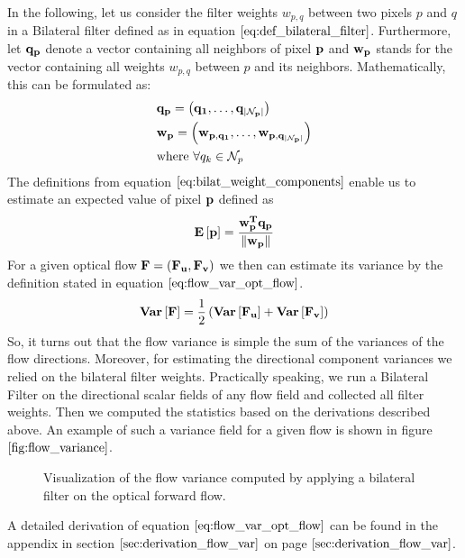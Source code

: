 In the following, let us consider the filter weights $w_{p,q}$ between two pixels $p$ and $q$ in a Bilateral filter defined as in equation $\ref{eq:def_bilateral_filter}$. Furthermore, let $\bf{q}_p$ denote a vector containing all neighbors of pixel $\bf{p}$ and $\bf{w}_p$ stands for the vector containing all weights $w_{p,q}$ between $p$ and its neighbors. Mathematically, this can be formulated as:
\begin{equation}
\begin{aligned}
& \bf{q_p} = \left( q_1, \dots, q_{|\mathcal{N}_p|} \right) \\
& \bf{w_p} = \left( w_{p, q_1}, \dots, w_{p, q_{|\mathcal{N}_p|}} \right) \\
& \text{where } \forall q_k \in \mathcal{N}_p
\end{aligned}
\label{eq:bilat_weight_components}
\end{equation}
The definitions from equation $\ref{eq:bilat_weight_components}$ enable us to estimate an expected value of pixel $\bf{p}$ defined as
\begin{equation}
	\mathbf{E} \left[ \bf{p} \right] = \frac{\bf{w}_{p}^{T} \bf{q}_p}{\left\lVert\bf{w}_{p}\right\rVert}
\end{equation}
For a given optical flow $\bf{F} = (\bf{F_u}, \bf{F_v})$ we then can estimate its variance by the definition stated in equation $\ref{eq:flow_var_opt_flow}$.
\begin{equation}
	\mathbf{Var} \left[ \bf{F} \right] = \frac{1}{2} \left( \mathbf{Var} \left[ \bf{F_u} \right] + \mathbf{Var} \left[ \bf{F_v} \right] \right)
\label{eq:flow_var_opt_flow}	
\end{equation}
So, it turns out that the flow variance is simple the sum of the variances of the flow directions. Moreover, for estimating the directional component variances we relied on the bilateral filter weights. Practically speaking, we run a Bilateral Filter on the directional scalar fields of any flow field and collected all filter weights. Then we computed the statistics based on the derivations described above. An example of such a variance field for a given flow is shown in figure $\ref{fig:flow_variance}$.
\begin{figure}[H]
\begin{center}
\end{center}
\caption[Flow Variance]{Visualization of the flow variance computed by applying a bilateral filter on the optical forward flow.}
\label{fig:flow_variance}
\end{figure}
A detailed derivation of equation $\ref{eq:flow_var_opt_flow}$ can be found in the appendix in section $\ref{sec:derivation_flow_var}$ on page $\pageref{sec:derivation_flow_var}$.

